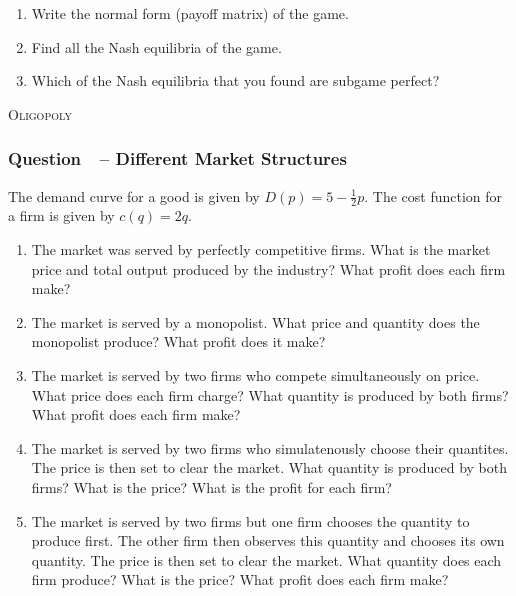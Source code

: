 \documentclass[12pt]{article}
\newcommand{\topic}[1]{\medskip\begin{center}\large\textsc{#1}\normalsize
  \end{center}}
\newcounter{question}[section]
\newcommand{\question}[1]{\refstepcounter{question}
  \subsubsection*{Question~\thequestion~-- #1}}
\newenvironment{subquestions}{
  \begin{enumerate}[label=(\roman*)]}{\end{enumerate}}
\begin{document}
\begin{subquestions}
  \item Write the normal form (payoff matrix) of the game.
  \item Find all the Nash equilibria of the game.
  \item Which of the Nash equilibria that you found are subgame perfect?
\end{subquestions}
\topic{Oligopoly}
\question{Different Market Structures}
The demand curve for a good is given by $D\left( p
\right)=5-\frac{1}{2}p$. The cost function for a firm is given by $c\left( q
\right)=2q$.
\begin{subquestions}
  \item The market was served by perfectly competitive firms.
      What is the market price and total output produced by the industry?  What
      profit does each firm make?
  \item The market is served by a monopolist. What price and quantity does the
    monopolist produce? What profit does it make?
  \item The market is served by two firms who compete simultaneously on price.
    What price does each firm charge? What quantity is produced by both firms?
    What profit does each firm make?
  \item  The market is served by two firms who simulatenously choose their
    quantites. The price is then set to clear the market. What quantity is
    produced by both firms? What is the price? What is the profit for each
    firm?
  \item The market is served by two firms but one firm chooses the quantity to
    produce first. The other firm then observes this quantity and chooses its
    own quantity. The price is then set to clear the market. What quantity does
    each firm produce? What is the price? What profit does each firm make?
\end{subquestions}
\end{document}
